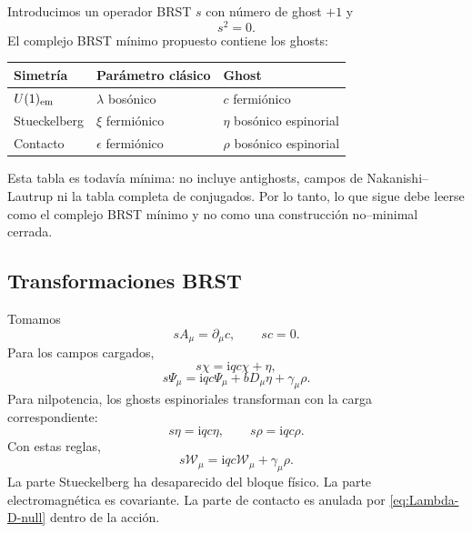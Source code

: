 \documentclass[11pt,a4paper]{article}
\numberwithin{equation}{section}
\newcommand{\Wcal}{\mathcal W}
\newcommand{\ii}{\mathrm i}
\begin{document}
Introducimos un operador BRST $s$ con número de ghost $+1$ y
\begin{equation}
s^2=0.
\end{equation}
El complejo BRST mínimo propuesto contiene los ghosts:
\begin{center}
\begin{tabular}{lll}
\toprule
Simetría & Parámetro clásico & Ghost \\
\midrule
$U(1)_{\rm em}$ & $\lambda$ bosónico & $c$ fermiónico \\
Stueckelberg & $\xi$ fermiónico & $\eta$ bosónico espinorial \\
Contacto & $\epsilon$ fermiónico & $\rho$ bosónico espinorial \\
\bottomrule
\end{tabular}
\end{center}

Esta tabla es todavía mínima: no incluye antighosts, campos de Nakanishi--Lautrup ni la tabla completa de conjugados. Por lo tanto, lo que sigue debe leerse como el complejo BRST mínimo y no como una construcción no--minimal cerrada.

\subsection{Transformaciones BRST}
\label{subsec:transformaciones-brst}

Tomamos
\begin{equation}
\label{eq:brst-A}
sA_\mu=\partial_\mu c,
\qquad
sc=0.
\end{equation}
Para los campos cargados,
\begin{equation}
\label{eq:brst-fields}
s\chi=\ii q c\chi+\eta,
\end{equation}
\begin{equation}
\label{eq:brst-psi}
s\Psi_\mu=\ii q c\Psi_\mu+bD_\mu\eta+\gamma_\mu\rho.
\end{equation}
Para nilpotencia, los ghosts espinoriales transforman con la carga correspondiente:
\begin{equation}
\label{eq:brst-ghosts}
s\eta=\ii q c\eta,
\qquad
s\rho=\ii q c\rho.
\end{equation}
Con estas reglas,
\begin{equation}
s\Wcal_\mu=\ii q c\Wcal_\mu+\gamma_\mu\rho.
\end{equation}
La parte Stueckelberg ha desaparecido del bloque físico. La parte electromagnética es covariante. La parte de contacto es anulada por \eqref{eq:Lambda-D-null} dentro de la acción.
\end{document}
